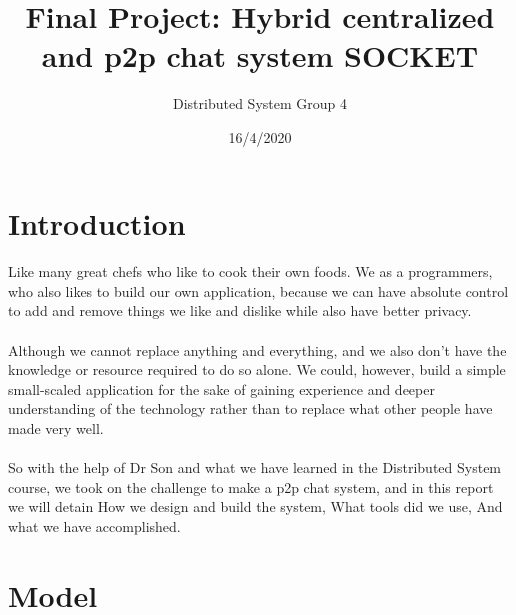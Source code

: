 \documentclass{article}
\title{Final Project: Hybrid centralized and p2p chat system SOCKET}
\date{16/4/2020}
\author{Distributed System Group 4}
\begin{document}
\maketitle
{}
\newpage
\tableofcontents
\newpage
{}


\section{Introduction}
\paragraph{}
Like many great chefs who like to cook their own foods. We as a programmers, who also likes to build our own application, because we can have absolute control to add and remove things we like and dislike while also have better privacy.
\paragraph{}
Although we cannot replace anything and everything, and we also don't have the knowledge or resource required to do so alone. We could, however, build a simple small-scaled application for the sake of gaining experience and deeper understanding of the technology rather than to replace what other people have made very well.
\paragraph{}
So with the help of Dr Son and what we have learned in the Distributed System course, we took on the challenge to make a p2p chat system, and in this report we will detain How we design and build the system, What tools did we use, And what we have accomplished.

\section{Model}
\end{document}
